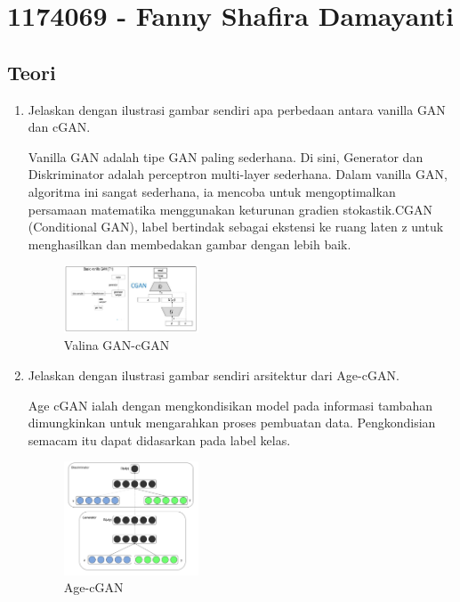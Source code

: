 \section{1174069 - Fanny Shafira Damayanti}

\subsection{Teori}
\begin{enumerate}

        \item Jelaskan dengan ilustrasi gambar sendiri apa perbedaan antara vanilla GAN dan cGAN.

Vanilla GAN adalah tipe GAN paling sederhana. Di sini, Generator dan Diskriminator adalah perceptron multi-layer sederhana. Dalam vanilla GAN, algoritma ini sangat sederhana, ia mencoba untuk mengoptimalkan persamaan matematika menggunakan keturunan gradien stokastik.CGAN (Conditional GAN), label bertindak sebagai ekstensi ke ruang laten z untuk menghasilkan dan membedakan gambar dengan lebih baik. 

	\begin{figure}[H]
            	\includegraphics[width=4cm]{figures/1174069/9/teori1.PNG}
           	\centering
           	\caption{Valina GAN-cGAN}
        	\end{figure}

        \item Jelaskan dengan ilustrasi gambar sendiri arsitektur dari Age-cGAN.

Age cGAN ialah dengan mengkondisikan model pada informasi tambahan dimungkinkan untuk mengarahkan proses pembuatan data. Pengkondisian semacam itu dapat didasarkan pada label kelas.

	\begin{figure}[H]
		\includegraphics[width=4cm]{figures/1174069/9/teori2.PNG}
            	\centering
           	\caption{Age-cGAN}
       	 \end{figure}


\end{enumerate}
